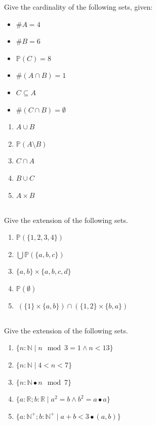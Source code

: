 \documentclass[twocolumn]{article}
\begin{document}
    Give the cardinality of the following sets, given:

\begin{multicols}{2}
    \begin{itemize}
        \item $\#A = 4$
        \item $\#B = 6$
        \item $\mathbb{P}(C) = 8$
        \item $\#(A \cap B) = 1$
        \item $ C \subseteq A $
        \item $ \# (C \cap B) = \emptyset$
    \end{itemize}
\end{multicols}

    \begin{enumerate}
        \item $ A \cup B $
        \item $ \mathbb{P}(A \setminus B)$
        \item $ C \cap A $
        \item $ B \cup C $
        \item $ A \times B $
    \end{enumerate}

    \subsection{}

    Give the extension of the following sets.

    \begin{enumerate}
        \item $\mathbb{P}(\{ 1, 2, 3, 4 \})$
        \item $ \bigcup  \mathbb{P}(\{a, b, c\})  $
        \item $ \{a, b\} \times \{ a, b, c, d \} $
        \item $ \mathbb{P} ( \emptyset ) $
        \item $ \ ( \{ 1 \} \times \{ a, b \} ) \cap ( \{ 1, 2 \} \times \{ b, a \} ) $
    \end{enumerate}


\subsection{}

    Give the extension of the following sets.

    \begin{enumerate}
        \item $\{ n : \mathbb{N} \mid n \mod 3 = 1 \wedge n < 13 \} $
        \item $\{ n : \mathbb{N} \mid 4 < n < 7 \} $
        \item $ \{ n : \mathbb{N} \bullet n \mod 7 \} $
        \item $\{ a : \mathbb{R}; b : \mathbb{R}  \mid a^2 = b \wedge b^2 = a \bullet a \} $
        \item $\{ a : \mathbb{N}^+; b : \mathbb{N}^+  \mid a + b < 3 \bullet (a, b) \} $
    \end{enumerate}
\end{document}
